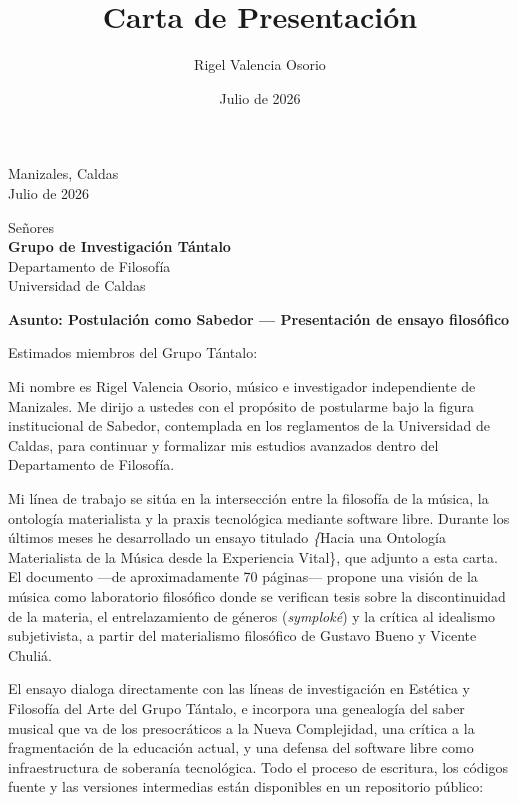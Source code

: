 \documentclass[12pt, a4paper]{article}
\author{Rigel Valencia Osorio}
\date{Julio de 2026}
\title{Carta de Presentación}
\begin{document}
\maketitle
\vspace*{2cm}

\begin{flushright}
Manizales, Caldas\\
Julio de 2026
\end{flushright}

\vspace{1cm}

\begin{flushleft}
Señores\\
\textbf{Grupo de Investigación Tántalo}\\
Departamento de Filosofía\\
Universidad de Caldas
\end{flushleft}

\vspace{1cm}

\textbf{Asunto: Postulación como Sabedor — Presentación de ensayo filosófico}

\vspace{0.5cm}

Estimados miembros del Grupo Tántalo:

\vspace{0.3cm}

Mi nombre es Rigel Valencia Osorio, músico e investigador independiente
de Manizales. Me dirijo a ustedes con el propósito de postularme bajo
la figura institucional de Sabedor, contemplada en los reglamentos de
la Universidad de Caldas, para continuar y formalizar mis estudios
avanzados dentro del Departamento de Filosofía.

Mi línea de trabajo se sitúa en la intersección entre la filosofía de
la música, la ontología materialista y la praxis tecnológica mediante
software libre. Durante los últimos meses he desarrollado un ensayo
titulado \textit\{Hacia una Ontología Materialista de la Música desde la
Experiencia Vital\}, que adjunto a esta carta. El documento —de
aproximadamente 70 páginas— propone una visión de la música como
laboratorio filosófico donde se verifican tesis sobre la discontinuidad
de la materia, el entrelazamiento de géneros (\textit{symploké}) y la
crítica al idealismo subjetivista, a partir del materialismo filosófico
de Gustavo Bueno y Vicente Chuliá.

El ensayo dialoga directamente con las líneas de investigación en
Estética y Filosofía del Arte del Grupo Tántalo, e incorpora una
genealogía del saber musical que va de los presocráticos a la Nueva
Complejidad, una crítica a la fragmentación de la educación actual, y
una defensa del software libre como infraestructura de soberanía
tecnológica. Todo el proceso de escritura, los códigos fuente y las
versiones intermedias están disponibles en un repositorio público:
\end{document}
